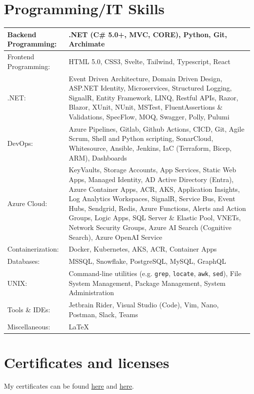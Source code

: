 \documentclass[a4paper,8pt]{article}
\begin{document}
\section{Programming/IT Skills}
\begin{tabular}{||p{5cm}|p{8cm}||}
\hline
Backend Programming: &  .NET (C\# 5.0+, MVC, CORE), Python, Git, Archimate \\
\hline
Frontend Programming: & HTML 5.0, CSS3, Svelte, Tailwind, Typescript, React \\
\hline
.NET:& Event Driven Architecture, Domain Driven Design, ASP.NET Identity, Microservices, Structured Logging, SignalR, Entity Framework, LINQ, Restful APIs, Razor, Blazor, XUnit, NUnit, MSTest, FluentAssertions \& Validations, SpecFlow, MOQ, Swagger, Polly, Pulumi \\
\hline
DevOps: & Azure Pipelines, Gitlab, Github Actions, CI\/CD, Git, Agile Scrum, Shell and Python scripting, SonarCloud, Whitesource, Ansible, Jenkins, IaC (Terraform, Bicep, ARM), Dashboards \\
\hline
Azure Cloud: & KeyVaults, Storage Accounts, App Services, Static Web Apps,
Managed Identity, AD Active Directory (Entra), Azure
Container Apps, ACR, AKS,
Application Insights, Log Analytics Workspaces,
SignalR, Service Bus, Event Hubs, Sendgrid, Redis,
Azure Functions, Alerts and Action Groups, Logic Apps,
SQL Server \& Elastic Pool, VNETs, Network Security Groups,
Azure AI Search (Cognitive Search), Azure OpenAI Service \\
\hline
Containerization: & Docker, Kubernetes, AKS, ACR, Container Apps \\
\hline
Databases: & MSSQL, Snowflake, PostgreSQL, MySQL, GraphQL \\
\hline
UNIX: & Command-line utilities (e.g. \verb|grep|, \verb|locate|, \verb|awk|, \verb|sed|), File System Management, Package Management, System Administration \\
\hline
Tools \& IDEs: & Jetbrain Rider, Visual Studio (Code), Vim, Nano, Postman, Slack, Teams \\
\hline
Miscellaneous: & \LaTeX \\
\hline
\end{tabular}

\section{Certificates and licenses}
My certificates can be found \hyperlink{https://www.credly.com/users/casper-dijkstra/badges}{here} and \hyperlink{https://learn.microsoft.com/en-us/users/casperdijkstra-0464/transcript/v2n6nap36zq90xk?tab=credentials-tab}{here}.
\end{document}
